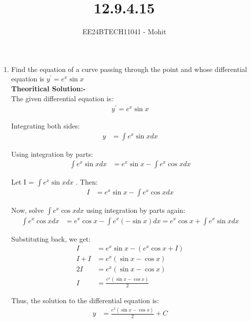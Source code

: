 \documentclass[journal]{IEEEtran}
\numberwithin{equation}{enumi}
\numberwithin{figure}{enumi}
\begin{document}

\title{12.9.4.15}
\author{EE24BTECH11041 - Mohit}
{\let\newpage\relax\maketitle}
\begin{enumerate}
\item Find the equation of a curve passing through the point  and whose differential equation
 is $y^{'} = e^x\sin{x}$\\
\textbf{Theoritical Solution:-}\\

The given differential equation is:
\begin{align}
y^{'} = e^x \sin{x}
\end{align}

Integrating both sides:
\begin{align}
y &= \int e^x \sin{x}dx
\end{align}

Using integration by parts:
\begin{align}
\int e^x \sin{x}dx &= e^x \sin{x} - \int e^x \cos{x} dx
\end{align}

Let I = $\int e^x \sin{x} dx$ . Then:
\begin{align}
I &= e^x \sin{x} - \int e^x \cos{x}dx
\end{align}

Now, solve $\int e^x \cos{x}dx$ using integration by parts again:
\begin{align}
\int e^x \cos{x}dx &= e^x \cos{x} - \int e^x (-\sin{x}) dx
= e^x \cos x + \int e^x \sin{x}dx
\end{align}

Substituting back, we get:
\begin{align}
I &= e^x \sin{x} - (e^x \cos{x} + I) \\
I + I &= e^x (\sin{x} - \cos{x}) \\
2I &= e^x (\sin{x} - \cos{x}) \\
I &= \frac{e^x (\sin{x} - \cos{x})}{2}
\end{align}

Thus, the solution to the differential equation is:
\begin{align}
y &= \frac{e^x (\sin{x} - \cos{x})}{2} + C
\end{align}


\end{enumerate}
\end{document}
